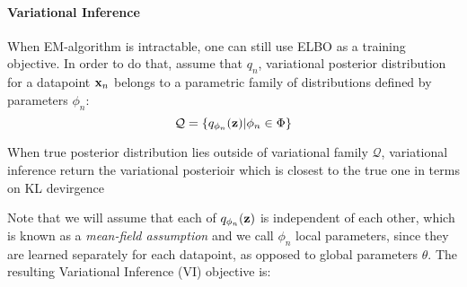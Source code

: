 \paragraph{Variational Inference}
When EM-algorithm is intractable, one can still use ELBO as a training objective. 
In order to do that, assume that $q_n$,  variational posterior distribution for a datapoint ${\mathbf{x}}_n$ belongs to a parametric family of distributions defined by parameters $\phi_n$:
\begin{equation}
    \mathcal{Q} = \{q_{\phi_n}({\mathbf{z}}) | \phi_n \in \Phi\}
\end{equation}
\begin{marginfigure}
\caption{When true posterior distribution lies outside of variational family $\mathcal{Q}$, variational inference return the variational posterioir which is closest to the true one in terms on KL devirgence}
\end{marginfigure}
Note that we will assume that each of $q_{\phi_n}({\mathbf{z}})$ is independent of each other, which is known as a \textit{mean-field assumption} and we call $\phi_n$ local parameters, since they are learned separately for each datapoint, as opposed to global parameters $\theta$. The resulting Variational Inference (VI) objective is: 
